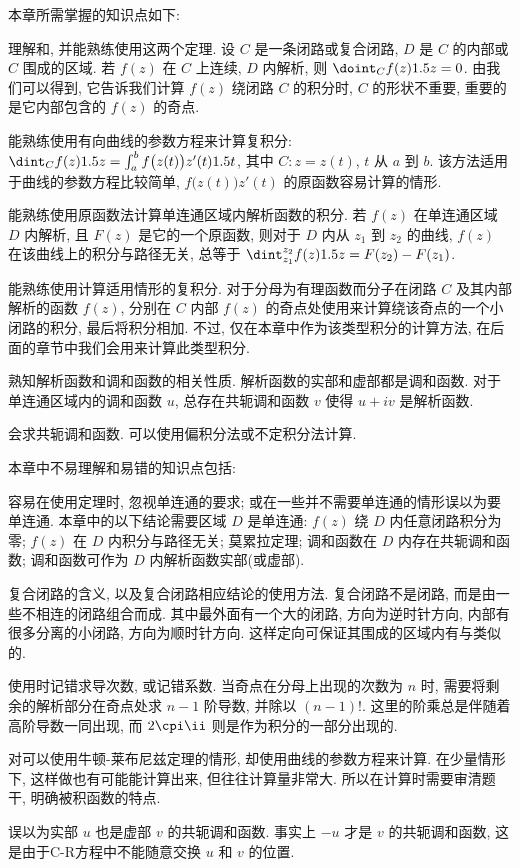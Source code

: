 本章所需掌握的知识点如下:
\begin{enuma}
  \item 理解\thmCG 和\thmCCC, 并能熟练使用这两个定理.
  设 $C$ 是一条闭路或复合闭路, $D$ 是 $C$ 的内部或 $C$ 围成的区域.
  若 $f(z)$ 在 $C$ 上连续, $D$ 内解析, 则 $\doint_C f(z)\d z=0$.
  由\thmCCC 我们可以得到\thmCT, 它告诉我们计算 $f(z)$ 绕闭路 $C$ 的积分时, $C$ 的形状不重要, 重要的是它内部包含的 $f(z)$ 的奇点.
  \item 能熟练使用有向曲线的参数方程来计算复积分: $\dint_C f(z)\d z=\int_a^bf\bigl(z(t)\bigr)z'(t)\d t$, 其中 $C:z=z(t)$, $t$ 从 $a$ 到 $b$.
  该方法适用于曲线的参数方程比较简单, $f\bigl(z(t)\bigr)z'(t)$ 的原函数容易计算的情形.
  \item 能熟练使用原函数法计算单连通区域内解析函数的积分.
  若 $f(z)$ 在单连通区域 $D$ 内解析, 且 $F(z)$ 是它的一个原函数, 则对于 $D$ 内从 $z_1$ 到 $z_2$ 的曲线, $f(z)$ 在该曲线上的积分与路径无关, 总等于 $\dint_{z_1}^{z_2}f(z)\d z=F(z_2)-F(z_1)$.
  \item 能熟练使用\thmCIH 计算适用情形的复积分. 对于分母为有理函数而分子在闭路 $C$ 及其内部解析的函数 $f(z)$, 分别在 $C$ 内部 $f(z)$ 的奇点处使用\thmCIH 来计算绕该奇点的一个小闭路的积分, 最后将积分相加.
  不过, \thmCIH 仅在本章中作为该类型积分的计算方法, 在后面的章节中我们会用\thmRes 来计算此类型积分.
  \item 熟知解析函数和调和函数的相关性质. 解析函数的实部和虚部都是调和函数. 对于单连通区域内的调和函数 $u$, 总存在共轭调和函数 $v$ 使得 $u+iv$ 是解析函数.
  \item 会求共轭调和函数. 可以使用偏积分法或不定积分法计算.
\end{enuma}

本章中不易理解和易错的知识点包括:
\begin{enuma}
  \item 容易在使用定理时, 忽视单连通的要求; 或在一些并不需要单连通的情形误以为要单连通.
  本章中的以下结论需要区域 $D$ 是单连通: $f(z)$ 绕 $D$ 内任意闭路积分为零; $f(z)$ 在 $D$ 内积分与路径无关; 莫累拉定理; 调和函数在 $D$ 内存在共轭调和函数; 调和函数可作为 $D$ 内解析函数实部(或虚部).
  \item 复合闭路的含义, 以及复合闭路相应结论的使用方法.
  复合闭路不是闭路, 而是由一些不相连的闭路组合而成.
  其中最外面有一个大的闭路, 方向为逆时针方向, 内部有很多分离的小闭路, 方向为顺时针方向.
  这样定向可保证其围成的区域内有与\thmCR 类似的\thmCCC.
  \item 使用\thmCIH 时记错求导次数, 或记错系数. 当奇点在分母上出现的次数为 $n$ 时, 需要将剩余的解析部分在奇点处求 $n-1$ 阶导数, 并除以 $(n-1)!$. 这里的阶乘总是伴随着高阶导数一同出现, 而 $2\cpi\ii$ 则是作为积分的一部分出现的.
  \item 对可以使用牛顿-莱布尼兹定理的情形, 却使用曲线的参数方程来计算. 在少量情形下, 这样做也有可能能计算出来, 但往往计算量非常大. 所以在计算时需要审清题干, 明确被积函数的特点.
  \item 误以为实部 $u$ 也是虚部 $v$ 的共轭调和函数. 事实上 $-u$ 才是 $v$ 的共轭调和函数, 这是由于C-R方程中不能随意交换 $u$ 和 $v$ 的位置.
\end{enuma}



